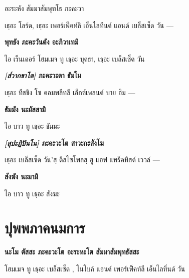 อะระหัง สัมมาสัมพุทโธ ภะคะวา

\begin{english}
	เธฺอะ โลร์ด, เธฺอะ เพอร์เฟ็คท์ลี เอ็นไลทึนด์ แอนด์ เบล็สเซ็ด  วัน —
\end{english}

\textbf{พุทธัง ภะคะวันตัง อะภิวาเทมิ}

\begin{english}
	ไอ เร็นเดอร์ โฮมเมจ ทู เธฺอะ บุดธา, เธฺอะ เบล็สเซ็ด  วัน  
\end{english}

\textbf{\textit{[ส๎วากขาโต]} ภะคะวะตา ธัมโม}

\begin{english}
	เธฺอะ ทีชชิง  โซ คอมพลีทลี เอ็กซ์เพลนด์ บาย ฮิม —
\end{english}

\textbf{ธัมมัง นะมัสสามิ}

\begin{english}
	ไอ บาว ทู เธฺอะ ธัมมะ  
\end{english}

\textbf{\textit{[สุปะฏิปันโน]} ภะคะวะโต สาวะกะสังโฆ}

\begin{english}
เธฺอะ เบล็สเซ็ด  วัน’สฺ ดิสไซโพลสฺ ฮู แฮฟ แพร็คทิสด์ เววล์ —
\end{english}

\textbf{สังฆัง นะมามิ}

\begin{english}
	ไอ บาว ทู เธฺอะ สังฆะ 
\end{english}


\chapter{ปุพพภาคนมการ}

\begin{leader}
\end{leader}

\begin{leader}
\end{leader}

\textbf{นะโม ตัสสะ ภะคะวะโต อะระหะโต สัมมาสัมพุทธัสสะ}  

\begin{english}
โฮมเมจ ทู เธฺอะ เบล็สเซ็ด , โนโบล์ แอนด์ เพอร์เฟ็คท์ลี เอ็นไลทึ่นด์ วัน\end{english}  
